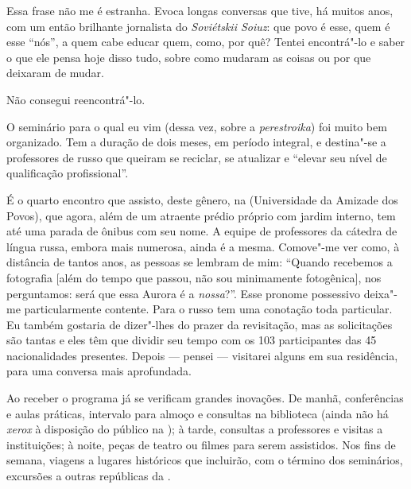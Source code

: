 Essa frase não me é estranha. Evoca longas conversas que tive, há muitos anos, com um então brilhante jornalista do \emph{Soviétskii Soiuz}: que povo é esse, quem é esse ``nós'', a quem cabe educar quem, como, por quê? Tentei encontrá"-lo e saber o que ele pensa hoje disso tudo, sobre como mudaram as coisas ou por que deixaram de mudar.

Não consegui reencontrá"-lo.

O seminário para o qual eu vim (dessa vez, sobre a \emph{perestroika}) foi muito bem organizado. Tem a duração de dois meses, em período integral, e destina"-se a professores de russo que queiram se reciclar, se atualizar e ``elevar seu nível de qualificação profissional''.

É o quarto encontro que assisto, deste gênero, na  (Universidade da Amizade dos Povos), que agora, além de um atraente prédio próprio com jardim interno, tem até uma parada de ônibus com seu nome. A equipe de professores da cátedra de língua russa, embora mais numerosa, ainda é a mesma. Comove"-me ver como, à distância de tantos anos, as pessoas se lembram de mim: ``Quando recebemos a fotografia [além do tempo que passou, não sou minimamente fotogênica], nos perguntamos: será que essa Aurora é a \emph{nossa}?''. Esse pronome possessivo deixa"-me particularmente contente. Para o russo tem uma conotação toda particular. Eu também gostaria de dizer"-lhes do prazer da revisitação, mas as solicitações são tantas e eles têm que dividir seu tempo com os 103 participantes das 45 nacionalidades presentes. Depois --- pensei --- visitarei alguns em sua residência, para uma conversa mais aprofundada.

Ao receber o programa já se verificam grandes inovações. De manhã, conferências e aulas práticas, intervalo para almoço e consultas na biblioteca (ainda não há \emph{xerox} à disposição do público na ); à tarde, consultas a professores e visitas a instituições; à noite, peças de teatro ou filmes para serem assistidos. Nos fins de semana, viagens a lugares históricos que incluirão, com o término dos seminários, excursões a outras repúblicas da .

